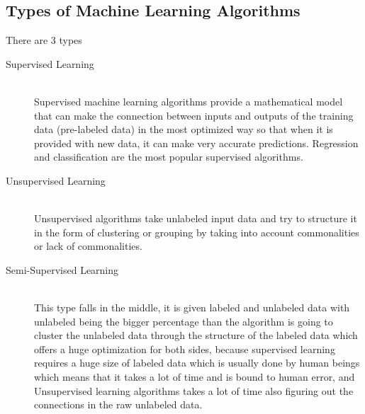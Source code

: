     \subsection{Types of Machine Learning Algorithms}
        There are 3 types ~\cite{ml}
        \begin{description}
        \item[Supervised Learning] \hfill \\
            Supervised machine learning algorithms provide a mathematical model that can make the connection between inputs and outputs of the training data (pre-labeled data) in the most optimized way so that when it is provided with new data, it can make very accurate predictions. Regression and classification are the most popular supervised algorithms.
        \item[Unsupervised Learning] \hfill \\
            Unsupervised algorithms take unlabeled input data and try to structure it in the form of clustering or grouping by taking into account commonalities or lack of commonalities.
        \item[Semi-Supervised Learning] \hfill \\
            This type falls in the middle, it is given labeled and unlabeled data with unlabeled being the bigger percentage than the algorithm is going to cluster the unlabeled data through the structure of the labeled data which offers a huge optimization for both sides, because supervised learning requires a huge size of labeled data which is usually done by human beings which means that it takes a lot of time and is bound to human error, and Unsupervised learning algorithms takes a lot of time also figuring out the connections in the raw unlabeled data.
        \end{description}

